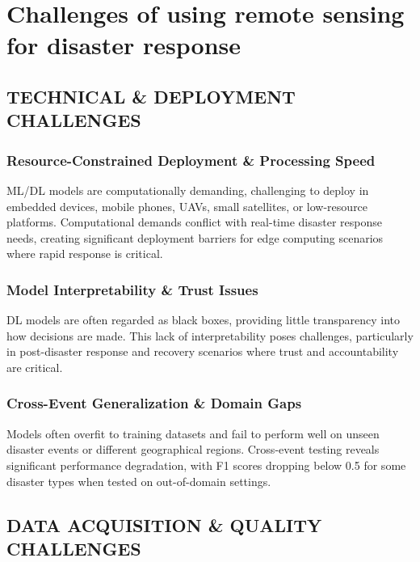 \documentclass[conference,a4paper]{IEEEtran}
\begin{document}

\section{Challenges of using remote sensing for disaster response}


\subsection{TECHNICAL \& DEPLOYMENT CHALLENGES}
\subsubsection{Resource-Constrained Deployment \& Processing Speed}
ML/DL models are computationally demanding, challenging to deploy in embedded devices, mobile phones, UAVs, small satellites, or low-resource platforms. Computational demands conflict with real-time disaster response needs, creating significant deployment barriers for edge computing scenarios where rapid response is critical.

\subsubsection{Model Interpretability \& Trust Issues}
DL models are often regarded as black boxes, providing little transparency into how decisions are made. This lack of interpretability poses challenges, particularly in post-disaster response and recovery scenarios where trust and accountability are critical.
\subsubsection{Cross-Event Generalization \& Domain Gaps}
Models often overfit to training datasets and fail to perform well on unseen disaster events or different geographical regions. Cross-event testing reveals significant performance degradation, with F1 scores dropping below 0.5 for some disaster types when tested on out-of-domain settings.
\subsection{DATA ACQUISITION \& QUALITY CHALLENGES}
\end{document}
